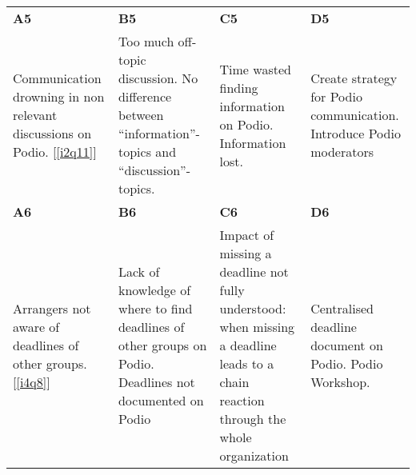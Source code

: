 \begin{tabular}{| p{3.5 cm} | p{3.5 cm} | p{3.5 cm} | p{3.5 cm} |}
  \hline
  \textbf{A5} & \textbf{B5} & \textbf{C5} & \textbf{D5} \\ 
   Communication drowning in non relevant discussions on Podio. [\ref{i2q11}]
  & Too much off-topic discussion. No difference between “information”-topics and “discussion”-topics.
  & Time wasted finding information on Podio. Information lost.
  & Create strategy for Podio communication. Introduce Podio moderators \\
  \hline
  \textbf{A6} & \textbf{B6} & \textbf{C6} & \textbf{D6} \\
  	Arrangers not aware of deadlines of other groups. [\ref{i4q8}]
  & Lack of knowledge of where to find deadlines of other groups on Podio. Deadlines not documented on Podio
  & Impact of missing a deadline not fully understood: when missing a deadline leads to a chain reaction through the whole organization
  & Centralised deadline document on Podio. Podio Workshop. \\
  \hline
\end{tabular}
